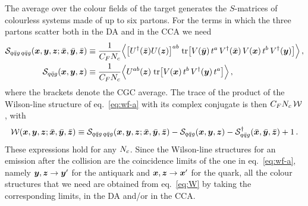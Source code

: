 The average over the colour fields of the target generates the $S$-matrices of colourless systems made
of up to six partons. For the terms in which the three partons scatter both in the DA and in the CCA we
need
\begin{align}
\mathcal{S}_{q\bar q g\,q\bar q g}(\bm{x},\bm{y},\bm{z};\bar{\bm{x}},\bar{\bm{y}},\bar{\bm{z}})&\equiv\frac{1}{C_FN_c}\Big\langle\big[U^\dagger(\bar{\bm{z}})U(\bm{z})\big]^{ab}\;
{\rm tr}\big[V(\bar{\bm{y}})\,t^a\,V^\dagger(\bar{\bm{x}})\,V(\bm{x})\,t^b\,V^\dagger(\bm{y})\big]\Big\rangle\,,
\nonumber\\
\mathcal{S}_{q\bar q g}(\bm{x},\bm{y},\bm{z})&\equiv\frac{1}{C_FN_c}\Big\langle U^{ab}(\bm{z})\;
{\rm tr}\big[V(\bm{x})\,t^b\,V^\dagger(\bm{y})\,t^a\big]\Big\rangle\,,
\label{eq:S6}
\end{align}
where the brackets denote the CGC average. The trace of the product of the Wilson-line structure of
eq.~\eqref{eq:wf-a} with its complex conjugate is then $C_FN_c\,\mathcal{W}$, with
\begin{equation}
\mathcal{W}(\bm{x},\bm{y},\bm{z};\bar{\bm{x}},\bar{\bm{y}},\bar{\bm{z}})\equiv\mathcal{S}_{q\bar q g\,q\bar q g}(\bm{x},\bm{y},\bm{z};\bar{\bm{x}},\bar{\bm{y}},\bar{\bm{z}})-\mathcal{S}_{q\bar q g}(\bm{x},\bm{y},\bm{z})
-\mathcal{S}^\dagger_{q\bar q g}(\bar{\bm{x}},\bar{\bm{y}},\bar{\bm{z}})+1\,.
\label{eq:W}
\end{equation}
These expressions hold for any $N_c$. Since the Wilson-line structures for an emission after the
collision are the coincidence limits of the one in eq.~\eqref{eq:wf-a}, namely $\bm{y},\bm{z}\to\bm{y}'$ for the
antiquark and $\bm{x},\bm{z}\to\bm{x}'$ for the quark, all the colour structures that we need are obtained from
eq.~\eqref{eq:W} by taking the corresponding limits, in the DA and/or in the CCA.

